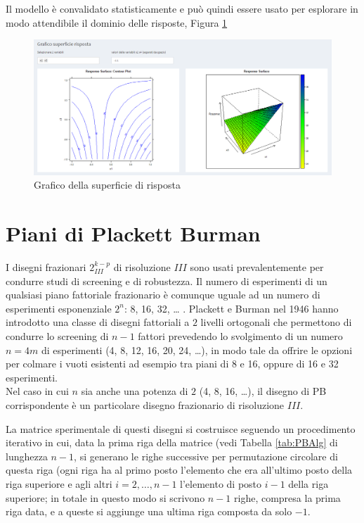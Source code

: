 \documentclass[
  11pt,
]{book}
\begin{document}
Il modello è convalidato statisticamente e può quindi essere usato per esplorare in modo attendibile il dominio delle risposte, Figura \ref{fig:fz10}

\begin{figure}[ht]

{\centering \includegraphics[width=1\linewidth]{Immagini/Fraz/10_sup_risp} 

}

\caption{Grafico della superficie di risposta}\label{fig:fz10}
\end{figure}

\hypertarget{piani-di-plackett-burman}{%
\chapter{Piani di Plackett Burman}\label{piani-di-plackett-burman}}

I disegni frazionari \(2_{III}^{k-p}\) di risoluzione \(III\) sono usati prevalentemente per condurre studi di screening e di robustezza. Il numero di esperimenti di un qualsiasi piano fattoriale frazionario è comunque uguale ad un numero di esperimenti esponenziale \(2^n\): 8, 16, 32, \ldots{} .
Plackett e Burman nel 1946 hanno introdotto una classe di disegni fattoriali a \(2\) livelli ortogonali che permettono di condurre lo screening di \(n-1\) fattori prevedendo lo svolgimento di un numero \(n=4m\) di esperimenti (4, 8, 12, 16, 20, 24, \ldots), in modo tale da offrire le opzioni per colmare i vuoti esistenti ad esempio tra piani di 8 e 16, oppure di 16 e 32 esperimenti.\\
Nel caso in cui \(n\) sia anche una potenza di \(2\) (4, 8, 16, \ldots), il disegno di PB corrispondente è un particolare disegno frazionario di risoluzione \(III\).

La matrice sperimentale di questi disegni si costruisce seguendo un procedimento iterativo in cui, data la prima riga della matrice (vedi Tabella \ref{tab:PBAlg} di lunghezza \(n-1\), si generano le righe successive per permutazione circolare di questa riga (ogni riga ha al primo posto l'elemento che era all'ultimo posto della riga superiore e agli altri \(i=2,\dots, n-1\) l'elemento di posto \(i-1\) della riga superiore; in totale in questo modo si scrivono \(n-1\) righe, compresa la prima riga data, e a queste si aggiunge una ultima riga composta da solo \(-1\).
\end{document}
